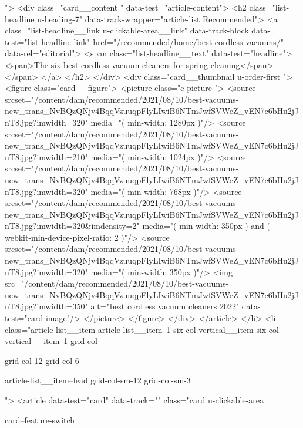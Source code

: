 {{{			
			 ">
<div class="card__content " data-test="article-content">
<h2 class="list-headline  u-heading-7" data-track-wrapper="article-list Recommended">
<a class="list-headline__link u-clickable-area__link" data-track-block data-test="list-headline-link" href="/recommended/home/best-cordless-vacuums/" data-rel="editorial">
<span class="list-headline__text" data-test="headline">
<span>The six best cordless vacuum cleaners for spring cleaning</span>
</span>
</a>
</h2>
</div>
<div class="card__thumbnail u-order-first ">
<figure class="card__figure">
<picture class="e-picture   ">
<source srcset="/content/dam/recommended/2021/08/10/best-vacuums-new_trans_NvBQzQNjv4BqqVzuuqpFlyLIwiB6NTmJwfSVWeZ_vEN7c6bHu2jJnT8.jpg?imwidth=320" media="( min-width: 1280px )"/>
<source srcset="/content/dam/recommended/2021/08/10/best-vacuums-new_trans_NvBQzQNjv4BqqVzuuqpFlyLIwiB6NTmJwfSVWeZ_vEN7c6bHu2jJnT8.jpg?imwidth=210" media="( min-width: 1024px )"/>
<source srcset="/content/dam/recommended/2021/08/10/best-vacuums-new_trans_NvBQzQNjv4BqqVzuuqpFlyLIwiB6NTmJwfSVWeZ_vEN7c6bHu2jJnT8.jpg?imwidth=320" media="( min-width: 768px )"/>
<source srcset="/content/dam/recommended/2021/08/10/best-vacuums-new_trans_NvBQzQNjv4BqqVzuuqpFlyLIwiB6NTmJwfSVWeZ_vEN7c6bHu2jJnT8.jpg?imwidth=320&imdensity=2" media="( min-width: 350px ) and ( -webkit-min-device-pixel-ratio: 2 )"/>
<source srcset="/content/dam/recommended/2021/08/10/best-vacuums-new_trans_NvBQzQNjv4BqqVzuuqpFlyLIwiB6NTmJwfSVWeZ_vEN7c6bHu2jJnT8.jpg?imwidth=320" media="( min-width: 350px )"/>
<img src="/content/dam/recommended/2021/08/10/best-vacuums-new_trans_NvBQzQNjv4BqqVzuuqpFlyLIwiB6NTmJwfSVWeZ_vEN7c6bHu2jJnT8.jpg?imwidth=350" alt="best cordless vacuum cleaners 2022" data-test="card-image"/>
</picture>
</figure>
</div>
</article>
</li>
<li class="article-list__item article-list__item--1 six-col-vertical__item six-col-vertical__item--1
			grid-col
			
			
			
			grid-col-12
			grid-col-6
			
			
			
			
			article-list__item--lead grid-col-sm-12
			grid-col-sm-3
			
			
			
			
			
			
			
			
			">
<article data-test="card" data-track="" class="card
			u-clickable-area
			
			card--feature-switch
			
			
			
}}}
